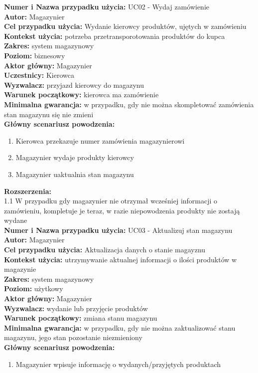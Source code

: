\textbf{Numer i Nazwa przypadku użycia:} UC02 - Wydaj zamówienie \\
\textbf{Autor:} Magazynier\\
\textbf{Cel przypadku użycia:} Wydanie kierowcy produktów, ujętych w zamówieniu \\
\textbf{Kontekst użycia:} potrzeba przetransporotowania produktów do kupca\\
\textbf{Zakres:} system magazynowy \\
\textbf{Poziom:} biznesowy \\
\textbf{Aktor główny:} Magazynier \\
\textbf{Uczestnicy:} Kierowca \\
\textbf{Wyzwalacz:} przyjazd kierowcy do magazynu \\
\textbf{Warunek początkowy:} kierowca ma zamówienie \\
\textbf{Minimalna gwarancja:} w przypadku, gdy nie można skompletować zamówienia stan magazynu się nie zmieni \\
\textbf{Główny scenariusz powodzenia:} \\
	\begin{enumerate}
		\item Kierowca przekazuje numer zamówienia magazynierowi
		\item Magazynier wydaje produkty kierowcy
		\item Magazynier uaktualnia stan magazynu
	\end{enumerate}
\textbf{Rozszerzenia:} \\
1.1 W przypadku gdy magazynier nie otrzymał wcześniej informacji o zamówieniu, kompletuje je teraz, w razie niepowodzenia produkty nie zostają wydane\\

\textbf{Numer i Nazwa przypadku użycia:} UC03 - Aktualizuj stan magazynu \\
\textbf{Autor:} Magazynier\\
\textbf{Cel przypadku użycia:} Aktualizacja danych o stanie magayznu \\
\textbf{Kontekst użycia:} utrzymywanie aktualnej informacji o ilości produktów w magazynie \\
\textbf{Zakres:} system magazynowy \\
\textbf{Poziom:} użytkowy \\
\textbf{Aktor główny:} Magazynier \\
\textbf{Wyzwalacz:} wydanie lub przyjęcie produktów \\
\textbf{Warunek początkowy:} zmiana stanu magazynu \\
\textbf{Minimalna gwarancja:} w przypadku, gdy nie można zaktualizować stanu magazynu, jego stan pozostanie niezmieniony \\
\textbf{Główny scenariusz powodzenia:} \\
	\begin{enumerate}
		\item Magazynier wpisuje informację o wydanych/przyjętych produktach
	\end{enumerate}

